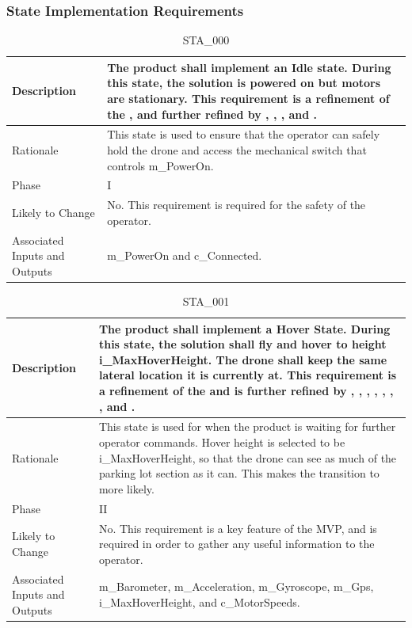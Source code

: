 \documentclass{article}
\begin{document}
\subsubsection{State Implementation Requirements}
\label{sec:stateReqs}

\begin{table}[!h]
\begin{center}
\caption {STA\_000} 
\label{STA_000}
\begin{tabular}{ | m{3cm} | m{11cm} | } 

\hline
Description & The product shall implement an Idle state. During this state, the solution is powered on but motors are stationary. This requirement is a refinement of the \nameref{Idle State}, and further refined by \nameref{PERF_007}, \nameref{SAFE_001}, \nameref{SAFE_003}, and \nameref{USE_003}. \\
\hline
Rationale & This state is used to ensure that the operator can safely hold the drone and access the mechanical switch that controls m\_PowerOn. \\
\hline
Phase & I \\
\hline
Likely to Change & No. This requirement is required for the safety of the operator. \\
\hline
Associated Inputs and Outputs & m\_PowerOn and c\_Connected. \\
\hline
\end{tabular}
\end{center}
\end{table}

\begin{table}[!h]
\begin{center}
\caption {STA\_001} 
\label{STA_001}
\begin{tabular}{ | m{3cm} | m{11cm} | }
\hline
Description & The product shall implement a Hover State. During this state, the solution shall fly and hover to height i\_MaxHoverHeight. The drone shall keep the same lateral location it is currently at.  This requirement is a refinement of the \nameref{Hover State} and is further refined by \nameref{PERF_002}, \nameref{PERF_004}, \nameref{PERF_005}, \nameref{PERF_006}, \nameref{PERF_007}, \nameref{SAFE_001}, \nameref{SAFE_003}, and \nameref{USE_003}. \\
\hline
Rationale & This state is used for when the product is waiting for further operator commands. Hover height is selected to be i\_MaxHoverHeight, so that the drone can see as much of the parking lot section as it can. This makes the transition to \nameref{Autonomous Explore State} more likely. \\
\hline
Phase & II \\
\hline
Likely to Change & No. This requirement is a key feature of the MVP, and is required in order to gather any useful information to the operator. \\
\hline
Associated Inputs and Outputs & m\_Barometer, m\_Acceleration, m\_Gyroscope, m\_Gps, i\_MaxHoverHeight, and c\_MotorSpeeds. \\
\hline
\end{tabular}
\end{center}
\end{table}
\end{document}
